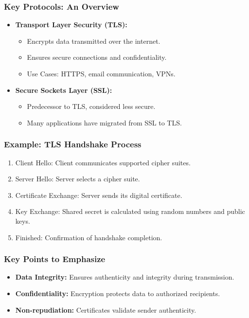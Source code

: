 \documentclass{beamer}
\begin{document}
\begin{frame}[fragile]
    \frametitle{Key Protocols: An Overview}
    \begin{itemize}
        \item \textbf{Transport Layer Security (TLS):}
        \begin{itemize}
            \item Encrypts data transmitted over the internet.
            \item Ensures secure connections and confidentiality.
            \item Use Cases: HTTPS, email communication, VPNs.
        \end{itemize}

        \item \textbf{Secure Sockets Layer (SSL):}
        \begin{itemize}
            \item Predecessor to TLS, considered less secure.
            \item Many applications have migrated from SSL to TLS.
        \end{itemize}
    \end{itemize}
\end{frame}

\begin{frame}[fragile]
    \frametitle{Example: TLS Handshake Process}
    \begin{enumerate}
        \item Client Hello: Client communicates supported cipher suites.
        \item Server Hello: Server selects a cipher suite.
        \item Certificate Exchange: Server sends its digital certificate.
        \item Key Exchange: Shared secret is calculated using random numbers and public keys.
        \item Finished: Confirmation of handshake completion.
    \end{enumerate}
\end{frame}

\begin{frame}[fragile]
    \frametitle{Key Points to Emphasize}
    \begin{itemize}
        \item \textbf{Data Integrity:} Ensures authenticity and integrity during transmission.
        \item \textbf{Confidentiality:} Encryption protects data to authorized recipients.
        \item \textbf{Non-repudiation:} Certificates validate sender authenticity.
    \end{itemize}
\end{frame}
\end{document}
